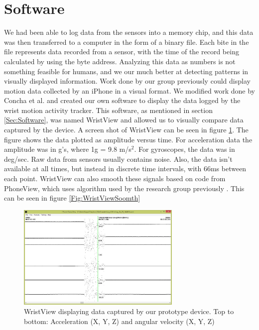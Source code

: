 \section{Software}
\label{Sec:ResultsSoftware}
We had been able to log data from the sensors into a memory chip,
and this data was then transferred to a computer in the form of a binary file.
Each bite in the file represents data recorded from a sensor,
with the time of the record being calculated by using the byte address.
Analyzing this data as numbers is not something feasible for humans,
and we our much better at detecting patterns in visually displayed information.
Work done by our group previously could display motion data collected by an iPhone in a visual format.
We modified work done by Concha et al. \cite{concha2014study} and created our own software to display the data logged by the wrist motion activity tracker.
This software, as mentioned in section \ref{Sec:Software},
was named WristView and allowed us to visually compare data captured by the device.
A screen shot of WristView can be seen in figure \ref{Fig:WristView}.
The figure shows the data plotted as amplitude versus time.
For acceleration data the amplitude was in g's, where 1g = 9.8 m/s$^2$. For gyroscopes, the data was in deg/sec.
Raw data from sensors usually contains noise.
Also, the data isn't available at all times,
but instead in discrete time intervals, with 66ms between each point.
WristView can also smooth these signals based on code from PhoneView, which uses algorithm used by the research group previously \cite{concha2014study}. This can be seen in figure \ref{Fig:WristViewSoomth}
\begin{figure}
\begin{center}
\includegraphics[width=0.7\textwidth]{images/WristView.jpg}
\caption{WristView displaying data captured by our prototype device. Top to bottom: Acceleration (X, Y, Z) and angular velocity (X, Y, Z)}
\label{Fig:WristView}
\end{center}
\end{figure}

